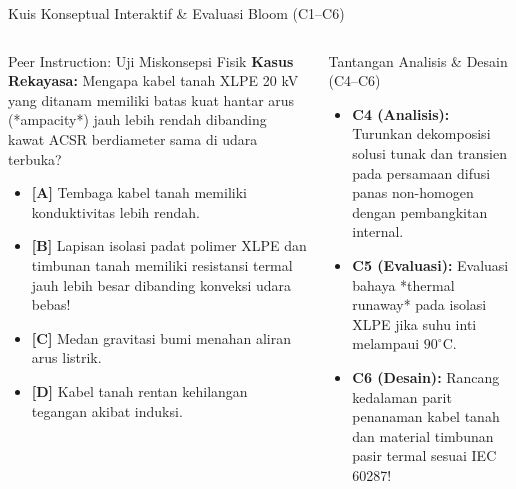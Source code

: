 \documentclass[aspectratio=169,10pt]{beamer}
\begin{document}
\begin{frame}{Kuis Konseptual Interaktif \& Evaluasi Bloom (C1--C6)}
  \begin{columns}[t]
    \begin{alertblock}{Peer Instruction: Uji Miskonsepsi Fisik}
      \footnotesize
      \textbf{Kasus Rekayasa:} Mengapa kabel tanah XLPE 20 kV yang ditanam memiliki batas kuat hantar arus (*ampacity*) jauh lebih rendah dibanding kawat ACSR berdiameter sama di udara terbuka?
      \vspace{0.05cm}
      \begin{itemize}\setlength{\itemsep}{1pt}
        \item \textbf{[A]} Tembaga kabel tanah memiliki konduktivitas lebih rendah.
        \item \textbf{[B]} Lapisan isolasi padat polimer XLPE dan timbunan tanah memiliki resistansi termal jauh lebih besar dibanding konveksi udara bebas!
        \item \textbf{[C]} Medan gravitasi bumi menahan aliran arus listrik.
        \item \textbf{[D]} Kabel tanah rentan kehilangan tegangan akibat induksi.
      \end{itemize}
    \end{alertblock}

    \begin{block}{Tantangan Analisis \& Desain (C4--C6)}
      \footnotesize
      \begin{itemize}\setlength{\itemsep}{2pt}
        \item \textbf{C4 (Analisis):} Turunkan dekomposisi solusi tunak dan transien pada persamaan difusi panas non-homogen dengan pembangkitan internal.
        \item \textbf{C5 (Evaluasi):} Evaluasi bahaya *thermal runaway* pada isolasi XLPE jika suhu inti melampaui $90^\circ\text{C}$.
        \item \textbf{C6 (Desain):} Rancang kedalaman parit penanaman kabel tanah dan material timbunan pasir termal sesuai IEC 60287!
      \end{itemize}
    \end{block}
  \end{columns}
\end{frame}
\end{document}
